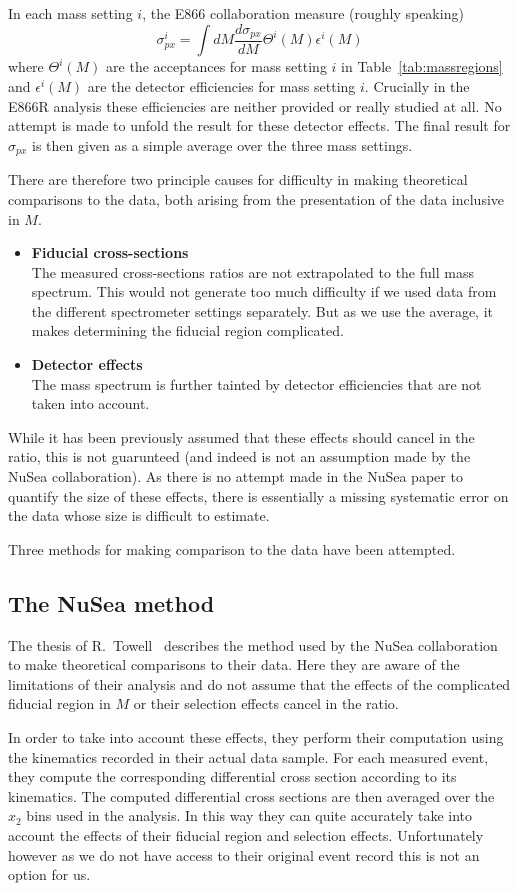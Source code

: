 \documentclass[11pt]{article}
\newcommand{\be}{\begin{equation}}
\newcommand{\ee}{\end{equation}}
\begin{document}
In each mass setting $i$, the E866 collaboration measure (roughly speaking)
\be \sigma^i_{px} = \int dM \frac{d\sigma_{px}}{dM} \Theta^i(M)\epsilon^i(M) \ee
where $\Theta^i(M)$ are the acceptances for mass setting $i$ in Table~\ref{tab:massregions} and
$\epsilon^i(M)$ are the detector efficiencies for mass setting $i$. Crucially in the E866R analysis
these efficiencies are neither provided or really studied at all. No attempt is made to unfold the result for
these detector effects. The final result for $\sigma_{px}$ is then given as a simple average over
the three mass settings.

There are therefore two principle causes for difficulty in making theoretical comparisons to the data, both arising from the presentation of the data inclusive in $M$.
\begin{itemize}
	\item \textbf{Fiducial cross-sections} \\
		The measured cross-sections ratios are not extrapolated to the full mass spectrum.
		This would not generate too much difficulty if we used data from the different spectrometer
		settings separately. But as we use the average, it makes determining the fiducial region complicated.
	\item \textbf{Detector effects} \\
		The mass spectrum is further tainted by detector efficiencies that are not taken into account.
\end{itemize}


While it has been previously assumed that these effects should cancel in the ratio, this is not guarunteed (and indeed is
not an assumption made by the NuSea collaboration). As there is no attempt made in the NuSea paper to quantify the size of these effects, 
there is essentially a missing systematic error on the data whose size is difficult to estimate.

Three methods for making comparison to the data have been attempted.
\subsection{The NuSea method}
The thesis of R.~Towell~\cite{Towell:2001dz} describes the method used by the NuSea collaboration
to make theoretical comparisons to their data. Here they are aware of the limitations of their analysis and do not assume
that the effects of the complicated fiducial region in $M$ or their selection effects cancel in the ratio.

In order to take into account these effects, they perform their computation using the kinematics recorded in their
actual data sample. For each measured event, they compute the corresponding differential cross section according
to its kinematics. The computed differential cross sections are then averaged over the $x_2$ bins used in the analysis.
In this way they can quite accurately take into account the effects of their fiducial region and selection effects. Unfortunately
however as we do not have access to their original event record this is not an option for us.
\end{document}
